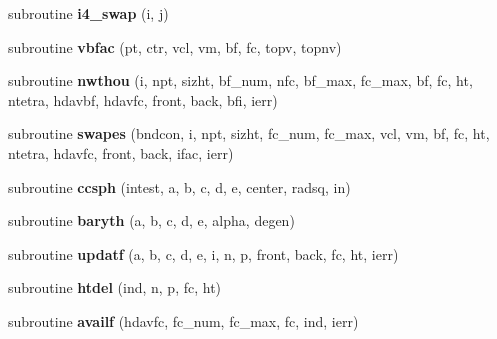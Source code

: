 \begin{DoxyCompactItemize}
\item 
\hypertarget{classgeompack_af761b81a1f9f1919f4fa7398294f0204}{subroutine {\bfseries i4\+\_\+swap} (i, j)}\label{classgeompack_af761b81a1f9f1919f4fa7398294f0204}

\item 
\hypertarget{classgeompack_a1c3d1834ba851e5883085a7538fac325}{subroutine {\bfseries vbfac} (pt, ctr, vcl, vm, bf, fc, topv, topnv)}\label{classgeompack_a1c3d1834ba851e5883085a7538fac325}

\item 
\hypertarget{classgeompack_a47f5b11cf75357fd64f413a95b8c3693}{subroutine {\bfseries nwthou} (i, npt, sizht, bf\+\_\+num, nfc, bf\+\_\+max, fc\+\_\+max, bf, fc, ht, ntetra, hdavbf, hdavfc, front, back, bfi, ierr)}\label{classgeompack_a47f5b11cf75357fd64f413a95b8c3693}

\item 
\hypertarget{classgeompack_ab9776020bebd9214113f936bcad52730}{subroutine {\bfseries swapes} (bndcon, i, npt, sizht, fc\+\_\+num, fc\+\_\+max, vcl, vm, bf, fc, ht, ntetra, hdavfc, front, back, ifac, ierr)}\label{classgeompack_ab9776020bebd9214113f936bcad52730}

\item 
\hypertarget{classgeompack_aad03504a4ad7580a4ce1f95e531fc192}{subroutine {\bfseries ccsph} (intest, a, b, c, d, e, center, radsq, in)}\label{classgeompack_aad03504a4ad7580a4ce1f95e531fc192}

\item 
\hypertarget{classgeompack_a5aa5b559af437154aad3f2244f5d8177}{subroutine {\bfseries baryth} (a, b, c, d, e, alpha, degen)}\label{classgeompack_a5aa5b559af437154aad3f2244f5d8177}

\item 
\hypertarget{classgeompack_a94821d7a86962c544c59783cbbe47741}{subroutine {\bfseries updatf} (a, b, c, d, e, i, n, p, front, back, fc, ht, ierr)}\label{classgeompack_a94821d7a86962c544c59783cbbe47741}

\item 
\hypertarget{classgeompack_a1b15210098b4ac9ad8f4455b58440b82}{subroutine {\bfseries htdel} (ind, n, p, fc, ht)}\label{classgeompack_a1b15210098b4ac9ad8f4455b58440b82}

\item 
\hypertarget{classgeompack_a1393b15dd71c58b324712b49d7b1b6e5}{subroutine {\bfseries availf} (hdavfc, fc\+\_\+num, fc\+\_\+max, fc, ind, ierr)}\label{classgeompack_a1393b15dd71c58b324712b49d7b1b6e5}


\end{DoxyCompactItemize}
